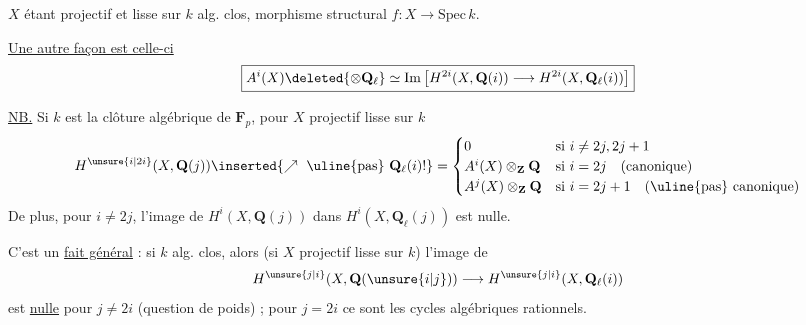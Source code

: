 $X$ étant projectif et lisse sur $k$ alg. clos, morphisme structural $f:X\longrightarrow\mathrm{Spec}\,k$.

\uline{Une autre façon est celle-ci}
\[
\boxed{A^i(X)\deleted{\otimes\mathbf{Q}_\ell}\simeq\mathrm{Im}\left[H^{2i}(X,\mathbf{Q}(i))\longrightarrow H^{2i}(X,\mathbf{Q}_\ell(i))\right]}
\]

\uline{NB.} Si $k$ est la clôture algébrique de $\mathbf{F}_p$,  pour $X$ projectif lisse sur $k$
\[
H^{\unsure{i|2i}}(X,\mathbf{Q}(j))\inserted{\nearrow\ \uline{\text{pas}}\ \mathbf{Q}_\ell(i)!}=
\begin{cases}
0&\text{si }i\ne 2j,2j+1\\
A^i(X)\otimes_{\mathbf{Z}}\mathbf{Q}&\text{si }i=2j\quad\text{(canonique)}\\
A^{j}(X)\otimes_{\mathbf{Z}}\mathbf{Q}&\text{si }i=2j+1\quad\text{(\uline{pas} canonique)}
\end{cases}
\]
De plus, pour $i\ne 2j$, l'image de $H^i(X,\mathbf{Q}(j))$ dans $H^i(X,\mathbf{Q}_\ell(j))$ est nulle.

C'est un \uline{fait général} : si $k$ alg. clos, alors (si $X$ projectif lisse sur $k$) l'image de
\[
H^{\unsure{j|i}}(X,\mathbf{Q}(\unsure{i|j}))\longrightarrow H^{\unsure{j|i}}(X,\mathbf{Q}_\ell(i))
\]
est \uline{nulle} pour $j\ne 2i$ (question de poids) ; pour $j=2i$ ce sont les cycles algébriques  rationnels.

